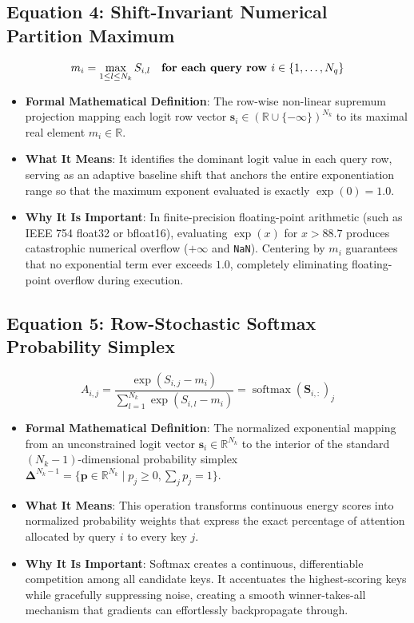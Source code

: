 \documentclass[11pt,a4paper]{article}
\theoremstyle{definition}
\begin{document}
\subsection{\textbf{Equation 4: Shift-Invariant Numerical Partition Maximum}}
{\boldmath
\begin{equation}
m_i = \max_{1 \le l \le N_k} S_{i, l} \quad \text{\textbf{for each query row }} i \in \{1, \dots, N_q\}
\end{equation}
}
\begin{itemize}
    \item \textbf{Formal Mathematical Definition}:
    The row-wise non-linear supremum projection mapping each logit row vector $\mathbf{s}_i \in (\mathbb{R} \cup \{-\infty\})^{N_k}$ to its maximal real element $m_i \in \mathbb{R}$.
    \item \textbf{What It Means}:
    It identifies the dominant logit value in each query row, serving as an adaptive baseline shift that anchors the entire exponentiation range so that the maximum exponent evaluated is exactly $\exp(0) = 1.0$.
    \item \textbf{Why It Is Important}:
    In finite-precision floating-point arithmetic (such as IEEE 754 float32 or bfloat16), evaluating $\exp(x)$ for $x > 88.7$ produces catastrophic numerical overflow ($+\infty$ and \texttt{NaN}). Centering by $m_i$ guarantees that no exponential term ever exceeds $1.0$, completely eliminating floating-point overflow during execution.
\end{itemize}

\subsection{\textbf{Equation 5: Row-Stochastic Softmax Probability Simplex}}
{\boldmath
\begin{equation}
A_{i, j} = \frac{\exp(S_{i, j} - m_i)}{\sum_{l=1}^{N_k} \exp(S_{i, l} - m_i)} = \operatorname{softmax}(\mathbf{S}_{i, :})_j
\end{equation}
}
\begin{itemize}
    \item \textbf{Formal Mathematical Definition}:
    The normalized exponential mapping from an unconstrained logit vector $\mathbf{s}_i \in \mathbb{R}^{N_k}$ to the interior of the standard $(N_k - 1)$-dimensional probability simplex $\boldsymbol{\Delta}^{N_k - 1} = \{ \mathbf{p} \in \mathbb{R}^{N_k} \mid p_j \ge 0, \sum_j p_j = 1 \}$.
    \item \textbf{What It Means}:
    This operation transforms continuous energy scores into normalized probability weights that express the exact percentage of attention allocated by query $i$ to every key $j$.
    \item \textbf{Why It Is Important}:
    Softmax creates a continuous, differentiable competition among all candidate keys. It accentuates the highest-scoring keys while gracefully suppressing noise, creating a smooth winner-takes-all mechanism that gradients can effortlessly backpropagate through.
\end{itemize}
\end{document}
